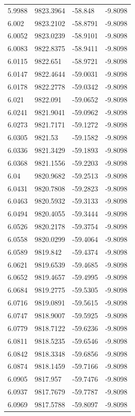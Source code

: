 \begin{table}[H]
\begin{tabular}{llll}
5.9988 & 9823.3964 & -58.848 & -9.8098 \\
6.002 & 9823.2102 & -58.8791 & -9.8098 \\
6.0052 & 9823.0239 & -58.9101 & -9.8098 \\
6.0083 & 9822.8375 & -58.9411 & -9.8098 \\
6.0115 & 9822.651 & -58.9721 & -9.8098 \\
6.0147 & 9822.4644 & -59.0031 & -9.8098 \\
6.0178 & 9822.2778 & -59.0342 & -9.8098 \\
6.021 & 9822.091 & -59.0652 & -9.8098 \\
6.0241 & 9821.9041 & -59.0962 & -9.8098 \\
6.0273 & 9821.7171 & -59.1272 & -9.8098 \\
6.0305 & 9821.53 & -59.1582 & -9.8098 \\
6.0336 & 9821.3429 & -59.1893 & -9.8098 \\
6.0368 & 9821.1556 & -59.2203 & -9.8098 \\
6.04 & 9820.9682 & -59.2513 & -9.8098 \\
6.0431 & 9820.7808 & -59.2823 & -9.8098 \\
6.0463 & 9820.5932 & -59.3133 & -9.8098 \\
6.0494 & 9820.4055 & -59.3444 & -9.8098 \\
6.0526 & 9820.2178 & -59.3754 & -9.8098 \\
6.0558 & 9820.0299 & -59.4064 & -9.8098 \\
6.0589 & 9819.842 & -59.4374 & -9.8098 \\
6.0621 & 9819.6539 & -59.4685 & -9.8098 \\
6.0652 & 9819.4657 & -59.4995 & -9.8098 \\
6.0684 & 9819.2775 & -59.5305 & -9.8098 \\
6.0716 & 9819.0891 & -59.5615 & -9.8098 \\
6.0747 & 9818.9007 & -59.5925 & -9.8098 \\
6.0779 & 9818.7122 & -59.6236 & -9.8098 \\
6.0811 & 9818.5235 & -59.6546 & -9.8098 \\
6.0842 & 9818.3348 & -59.6856 & -9.8098 \\
6.0874 & 9818.1459 & -59.7166 & -9.8098 \\
6.0905 & 9817.957 & -59.7476 & -9.8098 \\
6.0937 & 9817.7679 & -59.7787 & -9.8098 \\
6.0969 & 9817.5788 & -59.8097 & -9.8098 \\

\end{tabular}
\end{table}
